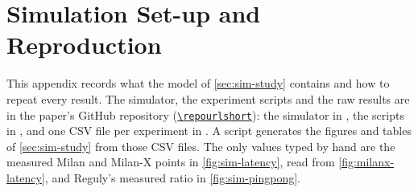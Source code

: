\section{Simulation Set-up and Reproduction}
\label{app:sim-setup}

This appendix records what the model of \cref{sec:sim-study} contains and how to repeat every result. The simulator, the experiment scripts and the raw results are in the paper's GitHub repository (\href{\repourl}{\nolinkurl{\repourlshort}}): the simulator in , the scripts in , and one CSV file per experiment in . A script generates the figures and tables of \cref{sec:sim-study} from those CSV files. The only values typed by hand are the measured Milan and Milan-X points in \cref{fig:sim-latency}, read from \cref{fig:milanx-latency}, and Reguly's measured ratio in \cref{fig:sim-pingpong}.


